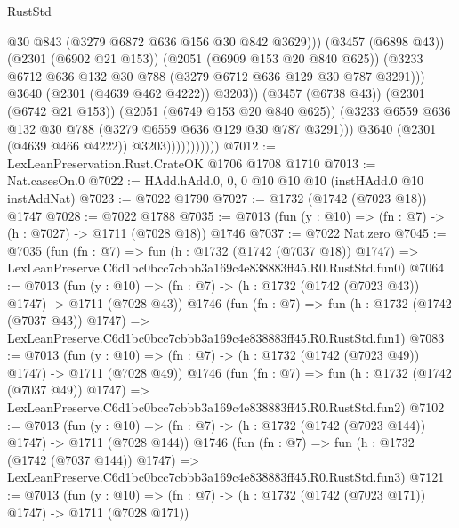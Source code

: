 \begin{lexlean}{RustStd}
\begin{coremodule}
                                      @30
                                      @843
                                      (@3279 @6872 @636 @156 @30 @842 @3629)))
                                  (@3457 (@6898 @43))
                                  (@2301 (@6902 @21 @153))
                                  (@2051 (@6909 @153 @20 @840 @625))
                                  (@3233
                                    @6712
                                    @636
                                    @132
                                    @30
                                    @788
                                    (@3279 @6712 @636 @129 @30 @787 @3291)))
                                @3640
                                (@2301 (@4639 @462 @4222))
                                @3203))
                            (@3457 (@6738 @43))
                            (@2301 (@6742 @21 @153))
                            (@2051 (@6749 @153 @20 @840 @625))
                            (@3233 @6559 @636 @132 @30 @788 (@3279 @6559 @636 @129 @30 @787 @3291)))
                          @3640
                          (@2301 (@4639 @466 @4222))
                          @3203)))))))))))
@7012 := LexLeanPreservation.Rust.CrateOK @1706 @1708 @1710
@7013 := Nat.casesOn.{0}
@7022 := HAdd.hAdd.{0, 0, 0} @10 @10 @10 (instHAdd.{0} @10 instAddNat)
@7023 := @7022 @1790
@7027 := @1732 (@1742 (@7023 @18)) @1747
@7028 := @7022 @1788
@7035 := @7013 (fun (y : @10) => (fn : @7) -> (h : @7027) -> @1711 (@7028 @18)) @1746
@7037 := @7022 Nat.zero
@7045 := @7035
    (fun (fn : @7) =>
    fun (h : @1732 (@1742 (@7037 @18)) @1747) =>
    LexLeanPreserve.C6d1bc0bcc7cbbb3a169c4e838883ff45.R0.RustStd.fun0)
@7064 := @7013
    (fun (y : @10) => (fn : @7) -> (h : @1732 (@1742 (@7023 @43)) @1747) -> @1711 (@7028 @43))
    @1746
    (fun (fn : @7) =>
    fun (h : @1732 (@1742 (@7037 @43)) @1747) =>
    LexLeanPreserve.C6d1bc0bcc7cbbb3a169c4e838883ff45.R0.RustStd.fun1)
@7083 := @7013
    (fun (y : @10) => (fn : @7) -> (h : @1732 (@1742 (@7023 @49)) @1747) -> @1711 (@7028 @49))
    @1746
    (fun (fn : @7) =>
    fun (h : @1732 (@1742 (@7037 @49)) @1747) =>
    LexLeanPreserve.C6d1bc0bcc7cbbb3a169c4e838883ff45.R0.RustStd.fun2)
@7102 := @7013
    (fun (y : @10) => (fn : @7) -> (h : @1732 (@1742 (@7023 @144)) @1747) -> @1711 (@7028 @144))
    @1746
    (fun (fn : @7) =>
    fun (h : @1732 (@1742 (@7037 @144)) @1747) =>
    LexLeanPreserve.C6d1bc0bcc7cbbb3a169c4e838883ff45.R0.RustStd.fun3)
@7121 := @7013
    (fun (y : @10) => (fn : @7) -> (h : @1732 (@1742 (@7023 @171)) @1747) -> @1711 (@7028 @171))

\end{coremodule}
\end{lexlean}
